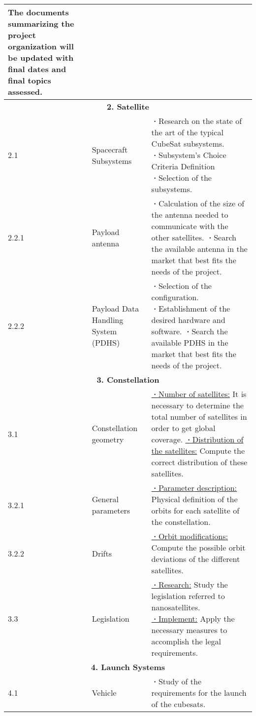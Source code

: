 \begin{longtable}{ | p{1.3cm} | p{3cm} | p{11cm} |}
The documents summarizing the project organization will be updated with final dates and final topics assessed.
\\
\hline
\multicolumn{3}{|c|}{\textbf{2. Satellite}} \\ \hline
2.1 & Spacecraft Subsystems &  \textbf{·}Research on the state of the art of the typical CubeSat subsystems. \newline
\textbf{·}Subsystem's Choice Criteria Definition
\newline
\textbf{·}Selection of the subsystems.
\\ \hline
2.2.1 & Payload antenna &  \textbf{·}Calculation of the size of the antenna needed to communicate with the other satellites. \newline
\textbf{·}Search the available antenna in the market that best fits the needs of the project.
\\
\hline
2.2.2 & Payload Data Handling System (PDHS) &  \textbf{·}Selection of the configuration. \newline
\textbf{·}Establishment of the desired hardware and software.
\newline
\textbf{·}Search the available PDHS in the market that best fits the needs of the project.
\\
\hline
\multicolumn{3}{|c|}{\textbf{3. Constellation}} \\ \hline
3.1 & Constellation geometry & \underline{\textbf{·}Number of satellites:} It is necessary to determine the total number of satellites in order to get global coverage. \newline
\underline{\textbf{·}Distribution of the satellites:} Compute the correct distribution of these satellites. \\
\hline
3.2.1 & General parameters & \underline{\textbf{·}Parameter description:} Physical definition of the orbits for each satellite of the constellation. \\ \hline
3.2.2 & Drifts & \underline{\textbf{·}Orbit modifications:} Compute the possible orbit deviations of the different satellites. \\ \hline
3.3 & Legislation & \underline{\textbf{·}Research:} Study the legislation referred to nanosatellites. \newline
\underline{\textbf{·}Implement:} Apply the necessary measures to accomplish the legal requirements. \\ \hline
\multicolumn{3}{|c|}{\textbf{4. Launch Systems}} \\ \hline
4.1 & Vehicle  & \textbf{·}Study of the requirements for the launch of the cubesats. \newline

\end{longtable}
